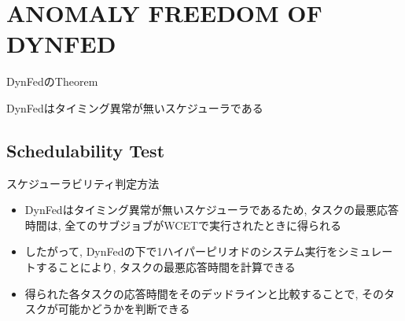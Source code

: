 
\section{ANOMALY FREEDOM OF DYNFED}
\label{sec: ANOMALY FREEDOM OF DYNFED}

\begin{frame}[label=theorem2]{DynFedのTheorem}
    \begin{theorem}[]
        DynFedはタイミング異常が無いスケジューラである
    \end{theorem}
\end{frame}


\subsection{Schedulability Test}
\label{ssec: Schedulability Test}

\begin{frame}{スケジューラビリティ判定方法}
    \begin{itemize}
        \item DynFedはタイミング異常が無いスケジューラであるため, タスクの最悪応答時間は, 全てのサブジョブがWCETで実行されたときに得られる
        \item したがって, DynFedの下で1ハイパーピリオドのシステム実行をシミュレートすることにより, タスクの最悪応答時間を計算できる
        \item 得られた各タスクの応答時間をそのデッドラインと比較することで, そのタスクが可能かどうかを判断できる
    \end{itemize}
\end{frame}
